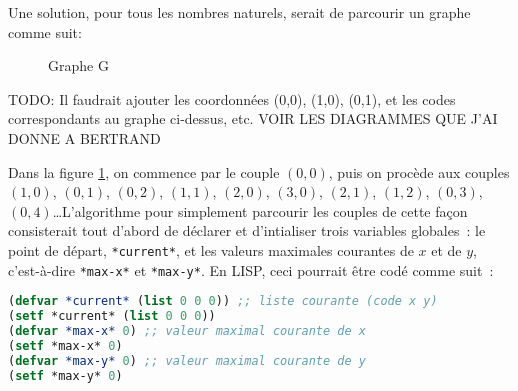 \documentclass{article}
\begin{document}
Une solution, pour tous les nombres naturels, serait de parcourir un graphe comme suit:


\begin{figure}[h!]
  \centering
  \caption{Graphe G}
  \label{fig:codage-zigzag}
\end{figure}




TODO: Il faudrait ajouter les coordonnées (0,0), (1,0), (0,1), et les codes correspondants au graphe ci-dessus, etc. VOIR LES DIAGRAMMES QUE J'AI DONNE A BERTRAND

Dans la figure \ref{fig:codage-zigzag}, on commence par le couple $(0,0)$, puis on procède aux couples $(1,0)$, $(0,1)$, $(0,2)$, $(1,1)$, $(2,0)$, $(3,0)$, $(2,1)$, $(1,2)$, $(0,3)$, $(0,4)$\ldots L'algorithme pour simplement parcourir les couples de cette façon consisterait tout d'abord de déclarer et d'intialiser trois variables globales~: le point de départ, \lstinline!*current*!, et les valeurs maximales courantes de $x$ et de $y$, c'est-à-dire \lstinline!*max-x*! et \lstinline!*max-y*!. En LISP, ceci pourrait être codé comme suit~:

\begin{lstlisting}[language=Lisp]
(defvar *current* (list 0 0 0)) ;; liste courante (code x y)
(setf *current* (list 0 0 0)) 
(defvar *max-x* 0) ;; valeur maximal courante de x
(setf *max-x* 0)
(defvar *max-y* 0) ;; valeur maximal courante de y
(setf *max-y* 0)
\end{lstlisting}
\end{document}
